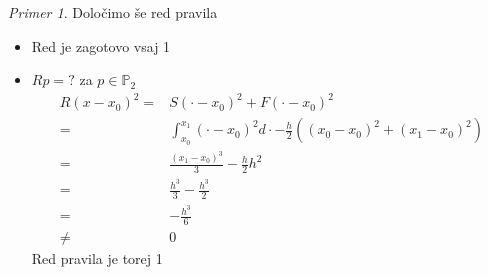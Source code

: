 \documentclass[a4paper,12pt]{article}
\theoremstyle{definition}
\theoremstyle{remark}
\newtheorem*{ex}{Primer}
\newcommand{\Pp}{\mathbb{P}}
\begin{document}
\begin{ex}
    Določimo še red pravila
    \begin{itemize}
        \item Red je zagotovo vsaj 1
        \item $Rp=?$ za $p\in \Pp_2$
        \begin{align*}
            R(x - x_0)^2 =& S(\cdot - x_0)^2 + F(\cdot - x_0)^2 \\
                         =& \int_{x_0}^{x_1} (\cdot - x_0)^2 d\cdot - \frac{h}{2}((x_0 - x_0)^2 + (x_1 - x_0)^2) \\
                         =& \frac{(x_1 - x_0)^3}{3} - \frac{h}{2} h^2 \\
                         =& \frac{h^3}{3} - \frac{h^3}{2} \\
                         =& - \frac{h^3}{6} \\
                         \neq& 0
        \end{align*}
        Red pravila je torej 1
    \end{itemize}
\end{ex}
\end{document}

